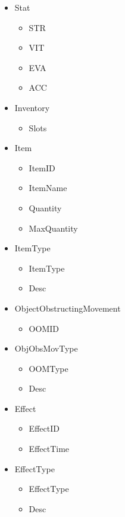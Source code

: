 \begin{itemize}
    \item Stat

    \begin{itemize}
        \item STR
        \item VIT
        \item EVA
        \item ACC
    \end{itemize}

    \item Inventory

    \begin{itemize}
        \item Slots
    \end{itemize}

    \item Item

    \begin{itemize}
        \item ItemID
        \item ItemName
        \item Quantity
        \item MaxQuantity
    \end{itemize}

    \item ItemType

    \begin{itemize}
        \item ItemType
        \item Desc
    \end{itemize}

    \item ObjectObstructingMovement

    \begin{itemize}
        \item OOMID
    \end{itemize}

    \item ObjObsMovType

    \begin{itemize}
        \item OOMType
        \item Desc
    \end{itemize}

    \item Effect

    \begin{itemize}
        \item EffectID
        \item EffectTime
    \end{itemize}

    \item EffectType

    \begin{itemize}
        \item EffectType
        \item Desc
    \end{itemize}

\end{itemize}

